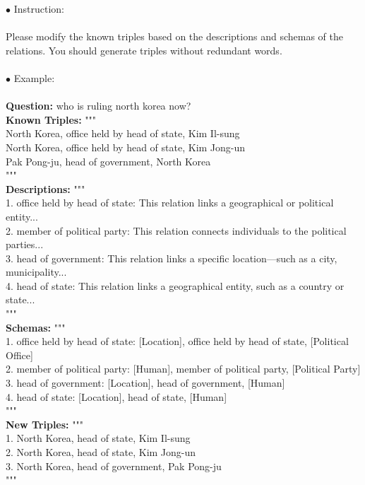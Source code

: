 

\begin{tcolorbox}[prompt=
{\begin{prompt} \label{prompts for modifying triples}The Prompt for Triple Modification
\end{prompt}}]
$\bullet$ Instruction: \\ \\
Please modify the known triples based on the descriptions and schemas of the relations. You should generate triples without redundant words. \\
\\
$\bullet$ Example: \\ \\
\textbf{Question: }who is ruling north korea now? \\
\textbf{Known Triples: }""" \\
North Korea, office held by head of state, Kim Il-sung \\
North Korea, office held by head of state, Kim Jong-un \\
Pak Pong-ju, head of government, North Korea \\
""" \\
\textbf{Descriptions: }""" \\
1. office held by head of state: This relation links a geographical or political entity... \\
2. member of political party: This relation connects individuals to the political parties... \\
3. head of government: This relation links a specific location—such as a city, municipality... \\
4. head of state: This relation links a geographical entity, such as a country or state... \\
""" \\
\textbf{Schemas: }""" \\
1. office held by head of state: [Location], office held by head of state, [Political Office] \\
2. member of political party: [Human], member of political party, [Political Party] \\
3. head of government: [Location], head of government, [Human] \\
4. head of state: [Location], head of state, [Human] \\
""" \\
\textbf{New Triples: }""" \\
1. North Korea, head of state, Kim Il-sung \\
2. North Korea, head of state, Kim Jong-un \\
3. North Korea, head of government, Pak Pong-ju \\
"""
\end{tcolorbox}